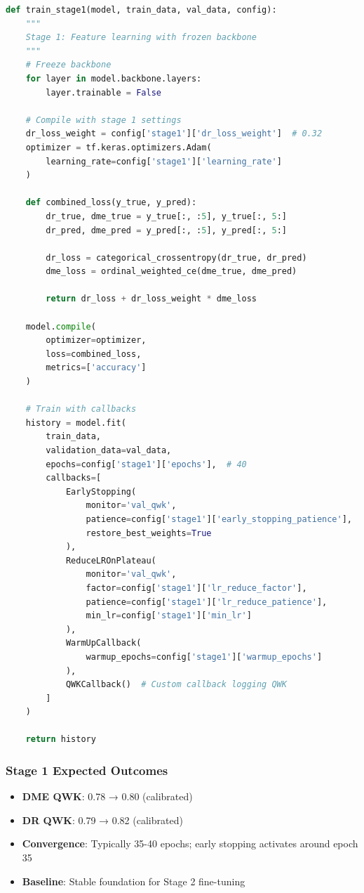\documentclass[12pt,a4paper]{article}
\begin{document}
\begin{lstlisting}[language=python, caption=Stage 1 Training Pseudocode]
def train_stage1(model, train_data, val_data, config):
    """
    Stage 1: Feature learning with frozen backbone
    """
    # Freeze backbone
    for layer in model.backbone.layers:
        layer.trainable = False
    
    # Compile with stage 1 settings
    dr_loss_weight = config['stage1']['dr_loss_weight']  # 0.32
    optimizer = tf.keras.optimizers.Adam(
        learning_rate=config['stage1']['learning_rate']
    )
    
    def combined_loss(y_true, y_pred):
        dr_true, dme_true = y_true[:, :5], y_true[:, 5:]
        dr_pred, dme_pred = y_pred[:, :5], y_pred[:, 5:]
        
        dr_loss = categorical_crossentropy(dr_true, dr_pred)
        dme_loss = ordinal_weighted_ce(dme_true, dme_pred)
        
        return dr_loss + dr_loss_weight * dme_loss
    
    model.compile(
        optimizer=optimizer,
        loss=combined_loss,
        metrics=['accuracy']
    )
    
    # Train with callbacks
    history = model.fit(
        train_data,
        validation_data=val_data,
        epochs=config['stage1']['epochs'],  # 40
        callbacks=[
            EarlyStopping(
                monitor='val_qwk',
                patience=config['stage1']['early_stopping_patience'],
                restore_best_weights=True
            ),
            ReduceLROnPlateau(
                monitor='val_qwk',
                factor=config['stage1']['lr_reduce_factor'],
                patience=config['stage1']['lr_reduce_patience'],
                min_lr=config['stage1']['min_lr']
            ),
            WarmUpCallback(
                warmup_epochs=config['stage1']['warmup_epochs']
            ),
            QWKCallback()  # Custom callback logging QWK
        ]
    )
    
    return history
\end{lstlisting}

\subsubsection{Stage 1 Expected Outcomes}

\begin{itemize}
    \item \textbf{DME QWK}: 0.78 → 0.80 (calibrated)
    \item \textbf{DR QWK}: 0.79 → 0.82 (calibrated)
    \item \textbf{Convergence}: Typically 35-40 epochs; early stopping activates around epoch 35
    \item \textbf{Baseline}: Stable foundation for Stage 2 fine-tuning
\end{itemize}
\end{document}
